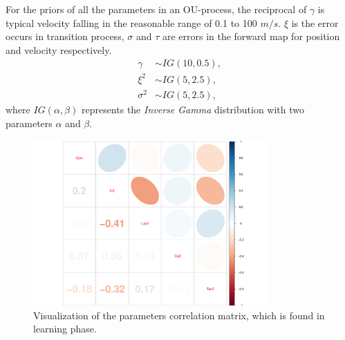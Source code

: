 \documentclass{beamer}
\begin{document}
\begin{frame}
For the priors of all the parameters in an OU-process, the reciprocal of $\gamma$ is typical velocity falling in the reasonable range of 0.1 to 100 $m/s$. $\xi$ is the error occurs in transition process, $\sigma$ and $\tau$ are errors in the forward map for position and velocity respectively. 
\begin{align*}
\gamma   &\sim IG(10,0.5),\\
\xi^2        &\sim IG(5,2.5),\\
\sigma^2 &\sim IG(5,2.5),
\end{align*}
where $IG(\alpha,\beta)$ represents the \textit{Inverse Gamma} distribution with two parameters $\alpha$ and $\beta$. 
\end{frame}


\begin{frame}
\begin{figure}[h]
\centering
\includegraphics[width=0.8\textwidth]{Chapters/05MCMCOU/plots/realdatalearningcorMatrix.pdf}
\caption{Visualization of the parameters correlation matrix, which is found in learning phase. }\label{realdatacorMatrix}
\end{figure}

\end{frame}
\end{document}
